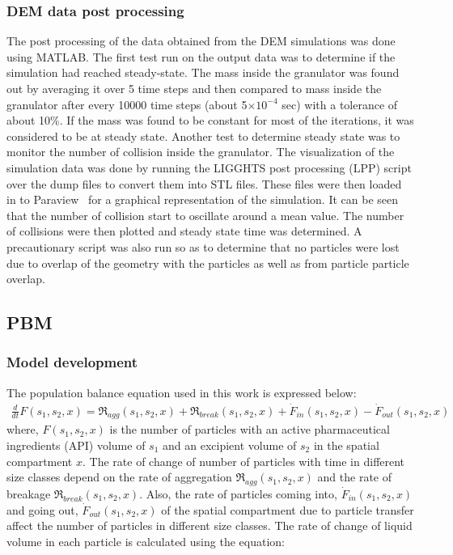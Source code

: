 \documentclass[preprint,11pt,authoryear]{elsarticle}
\begin{document}
\subsubsection{DEM data post processing}
 The post processing of the data obtained from the DEM simulations was done using MATLAB. 
The first test run on the output data was to determine if the simulation had reached steady-state. The 
mass inside the granulator was found out by averaging it over 5 time steps and then compared to 
mass inside the granulator after every 10000 time steps (about 5$\times 10^{-4}$ sec) with a 
tolerance of about 10\%. If the mass was found to be constant for most of the iterations, it was 
considered to be at steady state. Another test to determine steady state was to monitor the number of 
collision inside the granulator. The visualization of the simulation data was done by running the 
LIGGHTS post processing (LPP) script over the dump files to convert them into STL files. These 
files were then loaded in to Paraview~\citep{henderson2004} for a graphical representation of the 
simulation. It can be seen that the number of collision start to oscillate around a mean value. The 
number of collisions were then plotted and steady state time was determined.
A precautionary script was also run so as to determine that no particles were lost due to overlap 
of the geometry with the particles as well as from particle particle overlap.


\subsection{PBM}
\label{sec:pbm_model}
\subsubsection{Model development}
 The population balance equation used in this work is expressed below:
\begin{align}
\frac{d}{dt}F(s_1,s_2,x)=\Re_{agg}(s_1,s_2,x)+\Re_{break}(s_1,s_2,x)+\dot{F}_{in}(s_1,s_2,x)-\dot{F}_{out}(s_1,s_2,x)
\label{eqn:mthds_pbm_overall} 
\end{align}
where, $F(s_1,s_2,x)$ is the number of particles with an active pharmaceutical ingredients (API) volume of $s_1$ and an excipient 
volume of $s_2$ in the spatial compartment $x$. The rate of change of number of particles with time 
in different size classes depend on the rate of aggregation $\Re_{agg}(s_1,s_2,x)$ and the rate of 
breakage $\Re_{break}(s_1,s_2,x)$. Also, the rate of particles coming into, $\dot{F}_{in}(s_1,s_2,x)$ and 
going out, $\dot{F}_{out}(s_1,s_2,x)$ of the spatial compartment due to particle transfer affect the number of 
particles in different size classes. 
The rate of change of liquid volume in each particle is calculated using the equation: 
\end{document}
